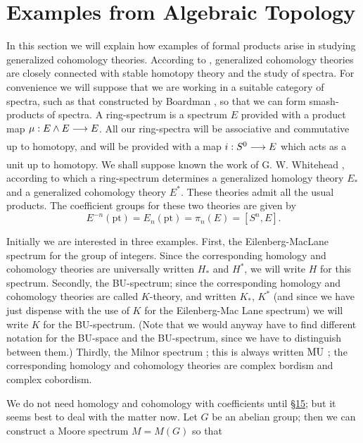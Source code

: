 \documentclass[../main]{subfiles}
\begin{document}
\label{sec:p2c2}

\chapter{Examples from Algebraic Topology}
In this section we will explain how examples of formal products arise in studying generalized cohomology theories. According to \cite{whitehead}, generalized cohomology theories are closely connected with stable homotopy theory and the study of spectra. For convenience we will suppose that we are working in a suitable category of spectra, such as that constructed by Boardman \cite{boardman,boardman2}, so that we can form smash-products of spectra. A ring-spectrum is a spectrum $E$ provided with a product map $\mu : E \wedge E \lar{} E$. All our ring-spectra will be associative and commutative up to homotopy, and will be provided with a map $i : S^0 \lar{} E$ which acts as a unit up to homotopy. We shall suppose known the work of G. W. Whitehead \cite{whitehead}, according to which a ring-spectrum determines a generalized homology theory $E_\ast$ and a generalized cohomology theory $E^\ast$. These theories admit all the usual products. The coefficient groups for these two theories are given by \[E^{-n}(\mathrm{pt}) = E_n(\mathrm{pt}) = \pi_n(E) = [S^n, E].\] 

Initially we are interested in three examples. First, the Eilenberg-MacLane spectrum for the group of integers. Since the corresponding homology and cohomology theories are universally written $H_\ast$ and $H^\ast$, we will write $H$ for this spectrum. Secondly, the BU-spectrum; since the corresponding homology and cohomology theories are called $K$-theory, and written $K_\ast$, $K^\ast$ (and since we have just dispense with the use of $K$ for the Eilenberg-Mac Lane spectrum) we will write $K$ for the BU-spectrum. (Note that we would anyway have to find different notation for the BU-space and the BU-spectrum, since we have to distinguish between them.) Thirdly, the Milnor spectrum \cite{milnor2}; this is always written $\mathrm{MU}$ ; the corresponding homology and cohomology theories are complex bordism and complex cobordism. 

We do not need homology and cohomology with coefficients until \hyperref[sec:p2c15]{\S 15}; but it seems best to deal with the matter now. Let $G$ be an abelian group; then we can construct a Moore spectrum $M = M(G)$ so that 
\end{document}

